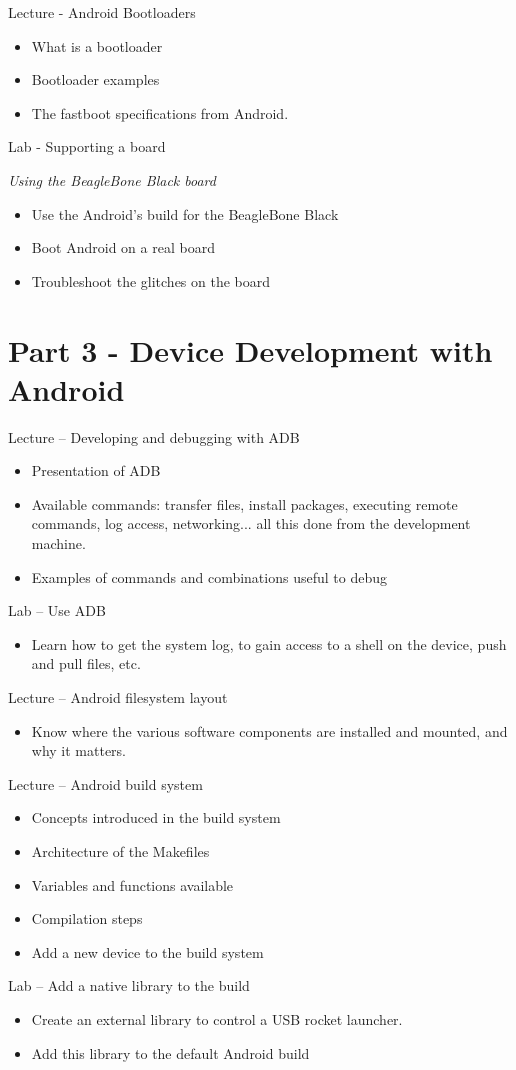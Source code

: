 \documentclass[a4paper,12pt,obeyspaces,spaces,hyphens]{article}
\begin{document}
\feagendatwocolumn
{Lecture - Android Bootloaders}
{
  \begin{itemize}
  \item What is a bootloader
  \item Bootloader examples
  \item The fastboot specifications from Android.
  \end{itemize}
}
{Lab - Supporting a board}
{
  {\em Using the BeagleBone Black board}
  \begin{itemize}
  \item Use the Android's build for the BeagleBone Black
  \item Boot Android on a real board
  \item Troubleshoot the glitches on the board
  \end{itemize}
}

\section{Part 3 - Device Development with Android}

\feagendatwocolumn
{Lecture – Developing and debugging with ADB}
{
  \begin{itemize}
  \item Presentation of ADB
  \item Available commands: transfer files,
    install packages, executing remote commands, log access,
    networking... all this done from the development machine.
  \item Examples of commands and combinations useful to debug
  \end{itemize}
}
{Lab – Use ADB}
{
  \begin{itemize}
  \item Learn how to get the system log, to gain access to a shell on
    the device, push and pull files, etc.
  \end{itemize}
}

\feagendaonecolumn
{Lecture – Android filesystem layout}
{
  \begin{itemize}
  \item Know where the various software components are installed and
    mounted, and why it matters.
  \end{itemize}
}

\feagendatwocolumn
{Lecture – Android build system}
{
  \begin{itemize}
  \item Concepts introduced in the build system
  \item Architecture of the Makefiles
  \item Variables and functions available
  \item Compilation steps
  \item Add a new device to the build system
  \end{itemize}
}
{Lab – Add a native library to the build}
{
  \begin{itemize}
  \item Create an external library to control a USB rocket launcher.
  \item Add this library to the default Android build
  \end{itemize}
}
\end{document}
